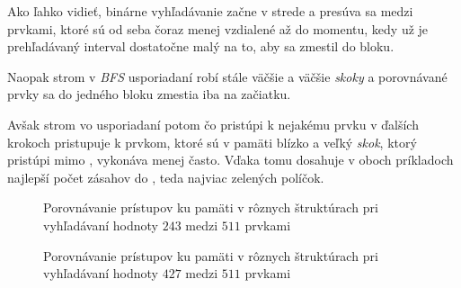 Ako ľahko vidieť, binárne vyhľadávanie začne v strede a presúva sa medzi prvkami, ktoré sú od seba  čoraz menej vzdialené až do momentu, kedy už je prehľadávaný interval dostatočne malý na to, aby sa zmestil do bloku.

Naopak strom v \emph{BFS} usporiadaní robí stále väčšie a väčšie \emph{skoky} a porovnávané prvky sa do jedného bloku zmestia iba na začiatku.

Avšak strom vo  usporiadaní potom čo pristúpi k nejakému prvku v ďalších krokoch pristupuje k prvkom, ktoré sú v pamäti blízko a veľký \emph{skok}, ktorý pristúpi mimo \cache, vykonáva menej často. Vďaka tomu dosahuje v oboch príkladoch najlepší počet zásahov do \cache, teda najviac zelených políčok.

%


\begin{sidewaysfigure}
    \centering
    \caption[Porovnávanie prístupov ku pamäti pri vyhľadávaní hodnoty $243$]{Porovnávanie prístupov ku pamäti v rôznych štruktúrach pri vyhľadávaní hodnoty $243$ medzi $511$ prvkami}
    \label{fig:search_comparison1}

    \vspace*{2cm} %
        
    \caption[Porovnávanie prístupov ku pamäti pri vyhľadávaní hodnoty $427$]{Porovnávanie prístupov ku pamäti v rôznych štruktúrach pri vyhľadávaní hodnoty $427$ medzi $511$ prvkami}
    \label{fig:search_comparison2}
\end{sidewaysfigure}

